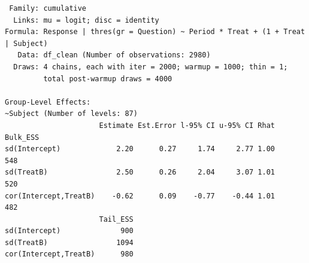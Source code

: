 \documentclass[
  12pt,
  a4paper,
  extrafontsizes,
  onecolumn,
  openright]{memoir}
\begin{document}
\begin{verbatim}
 Family: cumulative 
  Links: mu = logit; disc = identity 
Formula: Response | thres(gr = Question) ~ Period * Treat + (1 + Treat | Subject) 
   Data: df_clean (Number of observations: 2980) 
  Draws: 4 chains, each with iter = 2000; warmup = 1000; thin = 1;
         total post-warmup draws = 4000

Group-Level Effects: 
~Subject (Number of levels: 87) 
                      Estimate Est.Error l-95% CI u-95% CI Rhat Bulk_ESS
sd(Intercept)             2.20      0.27     1.74     2.77 1.00      548
sd(TreatB)                2.50      0.26     2.04     3.07 1.01      520
cor(Intercept,TreatB)    -0.62      0.09    -0.77    -0.44 1.01      482
                      Tail_ESS
sd(Intercept)              900
sd(TreatB)                1094
cor(Intercept,TreatB)      980


\end{verbatim}
\end{document}

